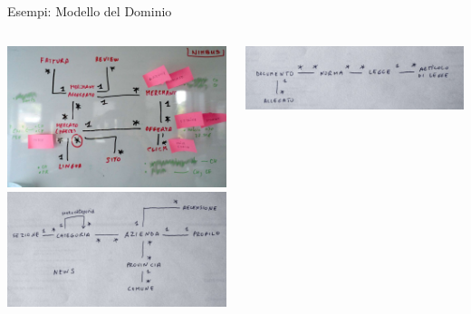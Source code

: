 	\begin{frame}{Esempi: Modello del Dominio}
		\begin{columns}[T]
		    \begin{column}{.5\textwidth}
				\includegraphics[scale=0.12]{images/domain-2}
				\\ \vspace*{0.4cm}
				\includegraphics[scale=0.15]{images/domain-4}
		    \end{column}
		    \begin{column}{.5\textwidth}
				\vspace*{0.3cm}
				\hspace*{-0.3cm} \includegraphics[scale=0.15]{images/domain-5}

\end{column}
\end{columns}
\end{frame}
